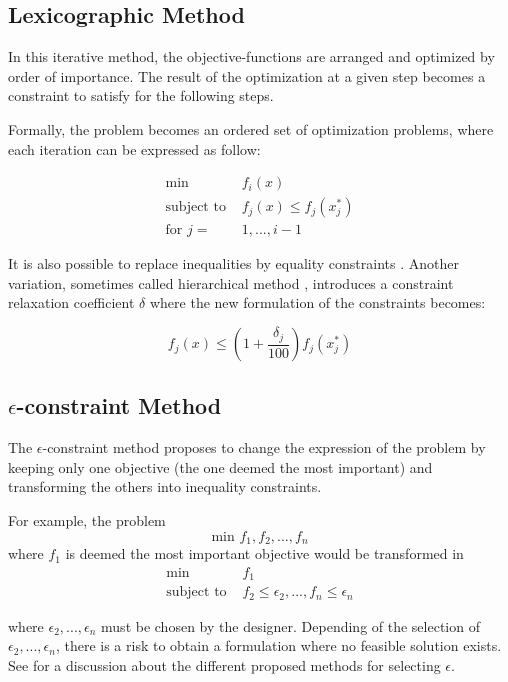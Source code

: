 \subsection{Lexicographic Method}

In this iterative method, the objective-functions are arranged and optimized by order of importance. The result of the optimization at a given step becomes a constraint to satisfy for the following steps.

Formally, the problem becomes an ordered set of optimization problems, where each iteration can be expressed as follow:

\begin{align*}
\text{min } &f_i(x)\\
\text{subject to } &f_j(x) \leq f_j(x_j^*)\\
\text{for } j = &1, ..., i-1
\end{align*}

It is also possible to replace inequalities by equality constraints \cite{stadler1988multicriteria}. Another variation, sometimes called hierarchical method \cite{osyczka1984multicriterion}, introduces a constraint relaxation coefficient $\delta$ where the new formulation of the constraints becomes:

$$f_j(x) \leq \left(1 + \frac{\delta_j}{100}\right) f_j(x_j^*)$$

\subsection{$\epsilon$-constraint Method}

The $\epsilon$-constraint method \cite{4308298} proposes to change the expression of the problem by keeping only one objective (the one deemed the most important) and transforming the others into inequality constraints.

For example, the problem
$$\text{min } f_1, f_2, ...,f_n$$
where $f_1$ is deemed the most important objective would be transformed in
\begin{align*}
\text{min } &f_1 \\
\text{subject to } &f_2 \leq \epsilon_2, ..., f_n \leq \epsilon_n
\end{align*}

where $\epsilon_2, ..., \epsilon_n$ must be chosen by the designer.
Depending of the selection of $\epsilon_2, ..., \epsilon_n$, there is a risk to obtain a formulation where no feasible solution exists.
See \cite{marler2004survey} for a discussion about the different proposed methods for selecting $\epsilon$.

